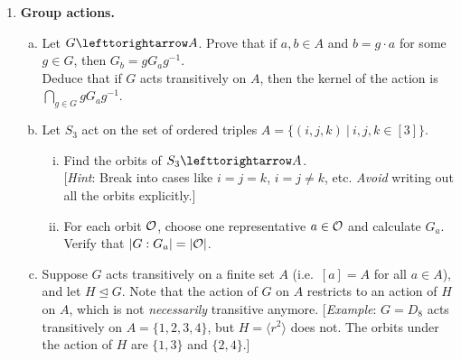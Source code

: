 \documentclass[11pt, reqno]{amsart}
\theoremstyle{plain}
\theoremstyle{definition}
\theoremstyle{example}
\def\<{\langle} \def\>{\rangle}
\def\acts{\lefttorightarrow}
\def\normeq{\unlhd}
\begin{document}
\begin{enumerate}[1.]
\item {\bf Group actions.}
\begin{enumerate}[(a)]
\item Let $G \acts A$. Prove that if $a, b \in A $ and $b = g\cdot a$ for some $g \in G$, then 
$G_b = g G_a g^{-1}$. \\
Deduce that if $G$ acts transitively on $A$, then the kernel of the action is $\bigcap_{g \in G} g G_a g^{-1}$. 
\item Let $S_3$ act on the set of ordered triples $A=\{(i, j, k) ~|~ i, j, k \in [3]\}$. 
\begin{enumerate}[(i)]
\item Find the orbits of $S_3 \acts A$. \\
{[\emph{Hint}: Break into cases like $i=j=k$, $i=j \neq k$, etc. \emph{Avoid} writing out all the orbits explicitly.]}
\item For each orbit $\mathcal{O}$, choose one representative $a \in \mathcal{O}$ and calculate $G_a$. Verify that $|G: G_a| = |\mathcal{O}|$. 
\end{enumerate}
\item Suppose $G$ acts transitively on a finite set $A$ (i.e.\ $[a] = A$ for all $a \in A$), and let $H \normeq G$. Note that the action of $G$ on $A$ restricts to an action of $H$ on $A$, which is not \emph{necessarily} transitive anymore. {[\emph{Example}: $G = D_8$ acts transitively on $A = \{1,2,3,4\}$, but $H = \<r^2\>$ does not. The orbits under the action of $H$ are $\{1,3\}$ and $\{2,4\}$.]}

\smallskip


\end{enumerate}
\end{enumerate}
\end{document}
